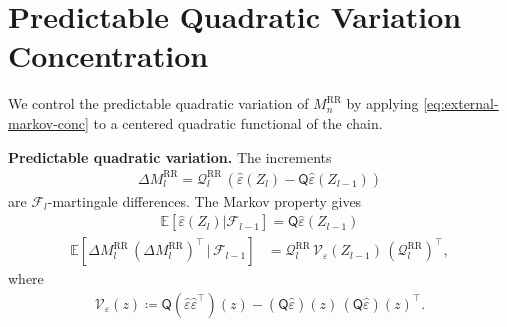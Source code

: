 
\section{Predictable Quadratic Variation Concentration}

We control the predictable quadratic variation of \(M_n^{\text{RR}}\) by applying
\eqref{eq:external-markov-conc} to a centered quadratic functional of the chain.

\textbf{Predictable quadratic variation.} The increments
\begin{equation}
\begin{aligned}
\Delta M_l^{\text{RR}} = \mathcal{Q}_l^{\text{RR}} \, (\widehat{\varepsilon}(Z_l) - \mathsf{Q} \widehat{\varepsilon}(Z_{l - 1}))
\end{aligned}
\end{equation}
are \(\mathcal{F}_l\)-martingale differences. The Markov property gives
\begin{equation}
\begin{aligned}
\mathbb{E}[\widehat{\varepsilon}(Z_l) | \mathcal{F}_{l - 1}] = \mathsf{Q} \widehat{\varepsilon}(Z_{l - 1})
\end{aligned}
\end{equation}
\begin{equation}
\begin{aligned}
\mathbb{E}[\Delta M_l^{\text{RR}} \, (\Delta M_l^{\text{RR}})^\top \, | \, \mathcal{F}_{l - 1}]
  &= \mathcal{Q}_l^{\text{RR}} \, \mathcal{V}_{\varepsilon}(Z_{l - 1}) \, (\mathcal{Q}_l^{\text{RR}})^\top,
\end{aligned}
\end{equation}
where
\begin{equation}
\begin{aligned}
\mathcal{V}_{\varepsilon}(z)
  \coloneqq \mathsf{Q}(\widehat{\varepsilon} \widehat{\varepsilon}^\top)(z)
   - (\mathsf{Q} \widehat{\varepsilon})(z) \, (\mathsf{Q} \widehat{\varepsilon})(z)^\top.
\end{aligned}
\label{eq:bar-eps-def}
\end{equation}

